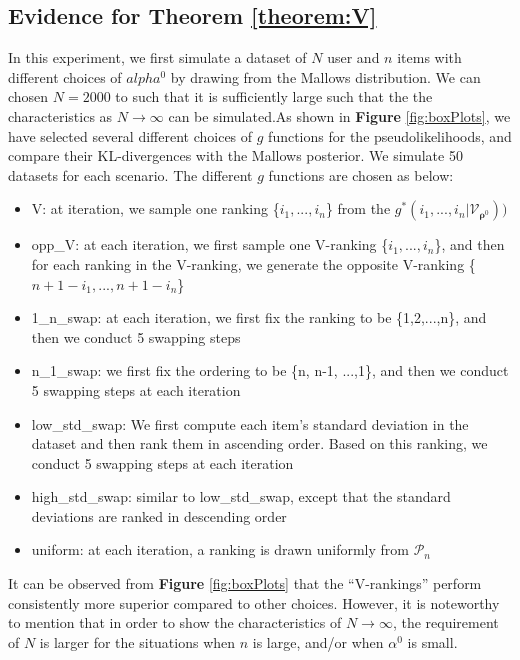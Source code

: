 \documentclass[11pt, oneside]{article}   	%
\begin{document}
\subsection{Evidence for Theorem \ref{theorem:V}}
In this experiment, we first simulate a dataset of $N$ user and $n$ items with different choices of $alpha^0$ by drawing from the Mallows distribution. We can chosen $N = 2000$ to such that it is sufficiently large such that the the characteristics as $N \rightarrow \infty$ can be simulated.As shown in \textbf{Figure} \ref{fig:boxPlots}, we have selected several different choices of $g$ functions for the pseudolikelihoods, and compare their KL-divergences with the Mallows posterior. We simulate 50 datasets for each scenario. The different $g$ functions are chosen as below:
\begin{itemize}
	\item {V: at iteration, we sample one ranking \{$i_1, ...,i_n$\} from the $g^*(i_1, ..., i_n | \mathcal{V}_{\bm{\rho}^0}))$}
	\item {opp\_V: at each iteration, we first sample one V-ranking \{$i_1, ...,i_n$\}, and then for each ranking in the V-ranking, we generate the opposite V-ranking \{$n+1 - i_1, ..., n+1 - i_n$\}}
	\item {1\_n\_swap: at each iteration, we first fix the ranking to be \{1,2,...,n\}, and then we conduct 5 swapping steps}
	\item {n\_1\_swap: we first fix the ordering to be \{n, n-1, ...,1\}, and then we conduct 5 swapping steps at each iteration}
	\item {low\_std\_swap: We first compute each item's standard deviation in the dataset and then rank them in ascending order. Based on this ranking, we conduct 5 swapping steps at each iteration}
	\item {high\_std\_swap: similar to low\_std\_swap, except that the standard deviations are ranked in descending order}
	\item{uniform: at each iteration, a ranking is drawn uniformly from $\mathcal{P}_n$}
\end{itemize}

It can be observed from \textbf{Figure} \ref{fig:boxPlots} that the ``V-rankings'' perform consistently more superior compared to other choices. However, it is noteworthy to mention that in order to show the characteristics of $N \rightarrow \infty$, the requirement of $N$ is larger for the situations when $n$ is large, and/or when $\alpha^0$ is small.
\end{document}
